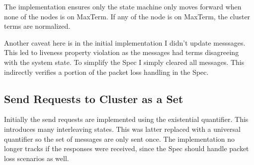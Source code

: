 \documentclass{report}
\begin{document}
The implementation ensures only the state machine only moves forward when none
of the nodes is on MaxTerm. If any of the node is on MaxTerm, the cluster terms
are normalized.\newline

Another caveat here is in the initial implementation I didn't update messsages.
This led to liveness property violation as the messages had terms disagreeing
with the system state. To simplify the Spec I simply cleared all messages. This 
indirectly verifies a portion of the packet loss handling in the Spec.

\subsection{Send Requests to Cluster as a Set}

Initially the send requests are implemented using the existential quantifier. 
This introduces many interleaving states. This was latter replaced with a
universal quantifier so the set of messages are only sent once. The
implementation no longer tracks if the responses were received, since the 
Spec should handle packet loss scenarios as well.\newline
\end{document}
